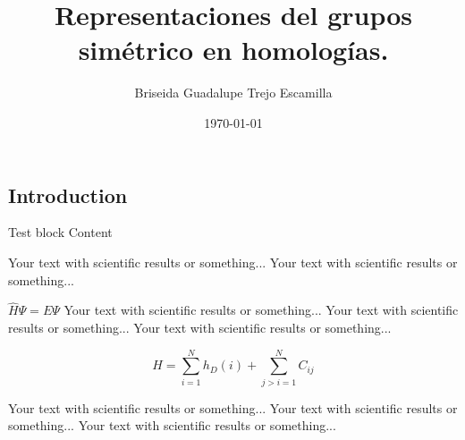 \documentclass[final]{beamer}
\title[XXIX Coloquio Víctor Neumann-Lara de Teoría de las Gráficas,
Combinatoria y sus Aplicaciones,
10 al 14 de marzo de 2014, Boca del Río, Veracruz] 
{%
Representaciones del grupos simétrico en homologías.
}
\author{Briseida Guadalupe Trejo Escamilla}
\institute{Universidad Autónoma del Estado de Hidalgo}
\date{\today}
\begin{document}
\begin{frame}[t]
\begin{multicols}{3}

\section{Introduction}

\begin{block}{Test block}
  Content
\end{block}

Your text with scientific results or something... 
Your text with scientific results or something... 

 $\hat H \Psi = E \Psi$  
Your text with scientific results or something... 
Your text with scientific results or something... 
Your text with scientific results or something... 

\begin{equation}
H = \sum_{i=1}^{N} h_{D}(i) + \sum_{j>i=1}^{N} C_{ij}
\end{equation}

Your text with scientific results or something... 
Your text with scientific results or something... 
Your text with scientific results or something... 


\end{multicols}
\end{frame}
\end{document}
